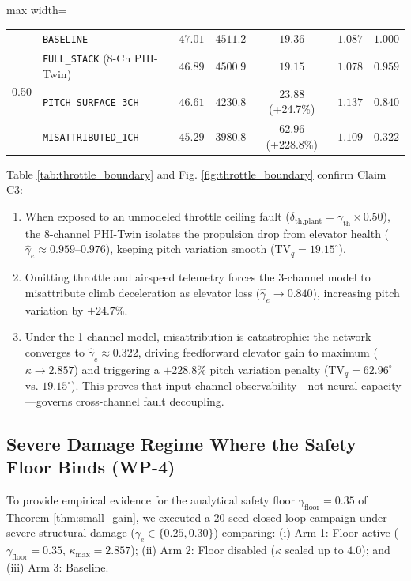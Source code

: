 \documentclass[review,12pt]{elsarticle}
\begin{document}
\begin{table}[!htbp]
\begin{adjustbox}{max width=\textwidth}
\begin{tabular}{llcccrc}
\midrule
\multirow{4}{*}{0.50} & \texttt{BASELINE} & $47.01$ & $4511.2$ & $19.36$ & $1.087$ & $1.000$ \\
 & \texttt{FULL\_STACK} (8-Ch PHI-Twin) & $\bm{46.89}$ & $\bm{4500.9}$ & $\bm{19.15}$ & $\bm{1.078}$ & $\bm{0.959}$ \\
 & \texttt{PITCH\_SURFACE\_3CH} & $46.61$ & $4230.8$ & $23.88$ (+24.7\%) & $1.137$ & $0.840$ \\
 & \texttt{MISATTRIBUTED\_1CH} & $45.29$ & $3980.8$ & $\bm{62.96}$ (+228.8\%) & $1.109$ & $\bm{0.322}$ \\
\bottomrule
\end{tabular}
\end{adjustbox}
\end{table}

Table \ref{tab:throttle_boundary} and Fig. \ref{fig:throttle_boundary} confirm Claim C3:
\begin{enumerate}
    \item When exposed to an unmodeled throttle ceiling fault ($\delta_{\text{th,plant}} = \gamma_{\text{th}} \times 0.50$), the 8-channel PHI-Twin isolates the propulsion drop from elevator health ($\hat{\gamma}_e \approx 0.959\text{--}0.976$), keeping pitch variation smooth ($\text{TV}_q = 19.15^\circ$).
    \item Omitting throttle and airspeed telemetry forces the 3-channel model to misattribute climb deceleration as elevator loss ($\hat{\gamma}_e \to 0.840$), increasing pitch variation by $+24.7\%$.
    \item Under the 1-channel model, misattribution is catastrophic: the network converges to $\hat{\gamma}_e \approx 0.322$, driving feedforward elevator gain to maximum ($\kappa \to 2.857$) and triggering a $+228.8\%$ pitch variation penalty ($\text{TV}_q = 62.96^\circ$ vs. $19.15^\circ$). This proves that input-channel observability—not neural capacity—governs cross-channel fault decoupling.
\end{enumerate}

\subsection{Severe Damage Regime Where the Safety Floor Binds (WP-4)}
\label{sec:wp4_severe}

To provide empirical evidence for the analytical safety floor $\gamma_{\text{floor}} = 0.35$ of Theorem \ref{thm:small_gain}, we executed a 20-seed closed-loop campaign under severe structural damage ($\gamma_e \in \{0.25, 0.30\}$) comparing: (i) Arm 1: Floor active ($\gamma_{\text{floor}} = 0.35$, $\kappa_{\max} = 2.857$); (ii) Arm 2: Floor disabled ($\kappa$ scaled up to $4.0$); and (iii) Arm 3: Baseline.
\end{document}
